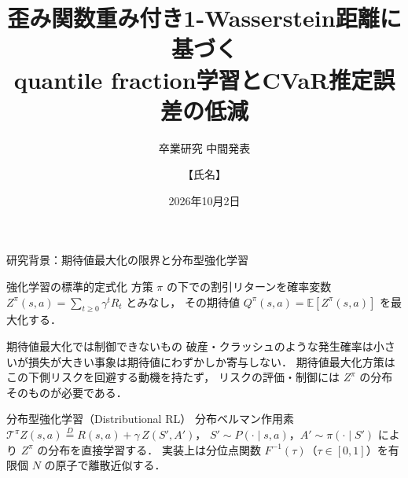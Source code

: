 \documentclass[aspectratio=169, 10pt]{beamer}
\title[歪み重み付き$W_1$によるquantile fraction学習]{歪み関数重み付き1-Wasserstein距離に基づく\texorpdfstring{\\}{ }quantile fraction学習とCVaR推定誤差の低減}
\subtitle{卒業研究 中間発表}
\author[【氏名】]{【氏名】}
\institute[【研究室名】]{【研究室名】\\ 指導教員：【指導教員名】}
\date{2026年10月2日}
\newcommand{\blue}[1]{\textcolor{blue!80!black}{#1}}
\providecommand{\Finv}{}\renewcommand{\Finv}{F^{-1}}
\newcommand{\E}{\mathbb{E}}
\begin{document}
\begin{frame}[plain]
  \titlepage
\end{frame}

\begin{frame}{研究背景：期待値最大化の限界と分布型強化学習}
  \begin{block}{強化学習の標準的定式化}
    方策 $\pi$ の下での割引リターンを確率変数 $Z^\pi(s,a)=\sum_{t\ge 0}\gamma^t R_t$ とみなし，
    その期待値 $Q^\pi(s,a)=\E[Z^\pi(s,a)]$ を最大化する．
  \end{block}
  \begin{alertblock}{期待値最大化では制御できないもの}
    破産・クラッシュのような\alert{発生確率は小さいが損失が大きい事象}は期待値にわずかしか寄与しない．
    期待値最大化方策はこの\alert{下側リスク}を回避する動機を持たず，
    リスクの評価・制御には $Z^\pi$ の\alert{分布そのもの}が必要である．
  \end{alertblock}
  \begin{block}{分布型強化学習（Distributional RL）}
    分布ベルマン作用素
    $\mathcal{T}^\pi Z(s,a) \overset{D}{=} R(s,a) + \gamma\, Z(S',A')$，
    $S'\sim P(\cdot\mid s,a)$，$A'\sim\pi(\cdot\mid S')$
    により $Z^\pi$ の分布を直接学習する．
    実装上は分位点関数 $\Finv(\tau)$（$\tau\in[0,1]$）を\blue{有限個 $N$ の原子}で離散近似する．
  \end{block}
\end{frame}
\end{document}
